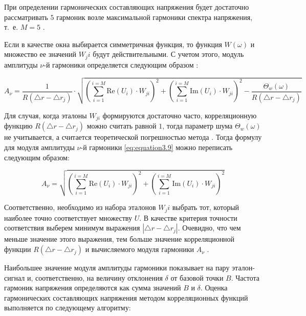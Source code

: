 При определении гармонических составляющих напряжения будет достаточно рассматривать $5$ гармоник возле максимальной гармоники спектра напряжения, т.~е. $M = 5$ \cite{Increase_Accuracy_Yelizarov2014}.
 
Если в качестве окна выбирается симметричная функция, то функция $W(\omega)$  и множество ее значений $W_ji$  будут действительными. С учетом этого, модуль амплитуды  $\nu$-й гармоники определяется следующим образом \cite{Increase_Accuracy_Yelizarov2014}:

\begin{equation}
	\label{eq:equation3.9}
	A_{\nu} = \frac{1}{R(\bigtriangleup r - \bigtriangleup r_j)} \cdot \sqrt{\left({\displaystyle\sum_{i=1}^{i=M}\mathrm{Re}(U_i) \cdot W_{ji}} \right)^2 + \left({\displaystyle\sum_{i=1}^{i=M}\mathrm{Im}(U_i) \cdot W_{ji}} \right)^2 - \frac{\Theta_w(\omega)}{R(\bigtriangleup r - \bigtriangleup r_j)}}
\end{equation}

Для случая, когда эталоны $W_{ji}$ формируются достаточно часто, корреляционную функцию $R(\bigtriangleup r - \bigtriangleup r_j) $  можно считать равной $1$, тогда параметр шума $\Theta_w(\omega)$ не учитывается, а считается теоретической погрешностью метода \cite{Increase_Accuracy_Yelizarov2014}. Тогда формулу для модуля амплитуды  $\nu$-й гармоники \ref{eq:equation3.9} можно переписать следующим образом:

\begin{equation}
	\label{eq:equation3.10}
	A_{\nu} =  \sqrt{\left({\displaystyle\sum_{i=1}^{i=M}\mathrm{Re}(U_i) \cdot W_{ji}} \right)^2 + \left({\displaystyle\sum_{i=1}^{i=M}\mathrm{Im}(U_i) \cdot W_{ji}} \right)^2}
\end{equation}

Соответственно, необходимо из набора  эталонов $W_ji$ выбрать тот, который наиболее точно соответствует множеству $U$. В качестве критерия точности соответствия выберем минимум выражения $ \left|{\bigtriangleup r - \bigtriangleup r_j}\right| $. Очевидно, что чем меньше значение этого выражения, тем больше значение корреляционной функции $R(\bigtriangleup r - \bigtriangleup r_j)$ и вычисляемого модуля гармоники $A_\nu$ \cite{Increase_Accuracy_Yelizarov2014}. 

Наибольшее значение модуля амплитуды гармоники показывает на пару эталон-сигнал и, соответственно, на величину отклонения $\delta$ от базовой точки $B$. Частота гармоник напряжения определяются как сумма значений $B$ и $\delta$.
Оценка гармонических составляющих напряжения методом корреляционных функций выполняется по следующему алгоритму:


